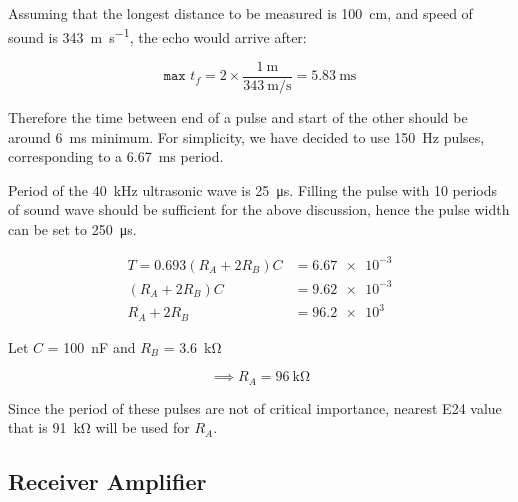 \documentclass[12pt, a4paper]{article}
\begin{document}
            \bigskip
            Assuming that the longest distance to be measured is \SI{100}{\centi\metre}, and speed of sound is \SI{343}{\metre\per\second}, the echo would arrive after:

            \begin{equation}
                \texttt{max }t_f = 2 \times \frac{\SI{1}{\metre}}{\SI{343}{\metre\per\second}} = \SI{5.83}{\milli\second}
            \end{equation}

            \noindent Therefore the time between end of a pulse and start of the other should be around \SI{6}{\milli\second} minimum. For simplicity, we have decided to use \SI{150}{\hertz} pulses, corresponding to a \SI{6.67}{\milli\second} period. 

            \bigskip
            \noindent Period of the \SI{40}{\kilo\hertz} ultrasonic wave is \SI{25}{\micro\second}. Filling the pulse with 10 periods of sound wave should be sufficient for the above discussion, hence the pulse width can be set to \SI{250}{\micro\second}.

            \begin{equation}\begin{aligned}
                T = 0.693(R_A + 2R_B)C &= \num{6.67e-3} \\
                         (R_A + 2R_B)C &= \num{9.62e-3} \\
                          R_A + 2R_B   &= \num{96.2e3}
            \end{aligned}\end{equation}

            \noindent Let $C$ = \SI{100}{\nano\farad} and $R_B$ = \SI{3.6}{\kilo\ohm}

            \begin{equation}
                \implies R_A = \SI{96}{\kilo\ohm} 
            \end{equation}

            \noindent Since the period of these pulses are not of critical importance, nearest E24 value that is \SI{91}{\kilo\ohm} will be used for $R_A$.

	

        \subsection{Receiver Amplifier}
\end{document}
